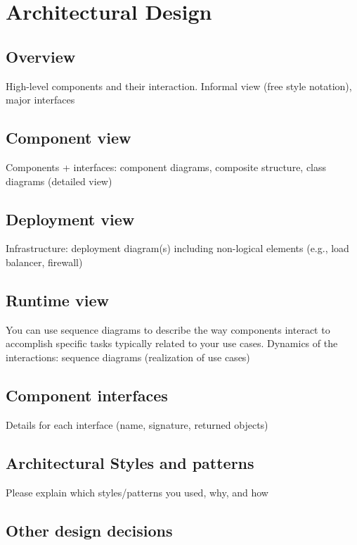 \section{Architectural Design}
\subsection{Overview}
High-level components and their interaction. Informal view (free style notation), major
interfaces

\subsection{Component view}
Components + interfaces: component diagrams, composite structure, class diagrams (detailed view)
\subsection{Deployment view}
Infrastructure: deployment diagram(s) including non-logical elements (e.g., load balancer, firewall)
\subsection{Runtime view}
You can use sequence diagrams to describe the way components interact to accomplish specific tasks typically related to your use cases. Dynamics of the interactions: sequence
diagrams (realization of use cases)
\subsection{Component interfaces}
Details for each interface (name, signature, returned objects)
\subsection{Architectural Styles and patterns}
Please explain which styles/patterns you used, why, and how
\subsection{Other design decisions}